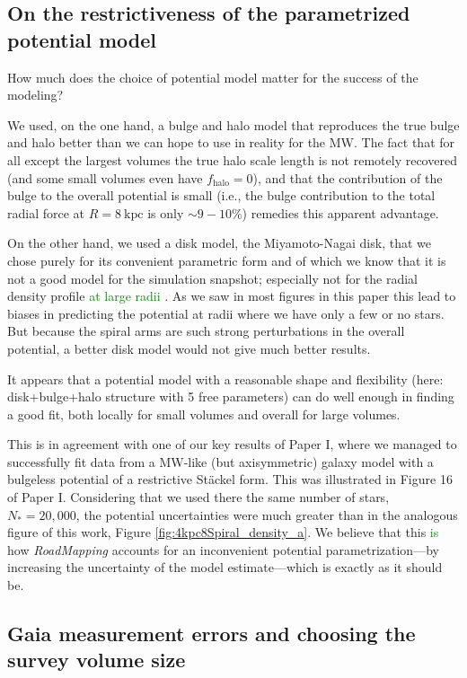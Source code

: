 \documentclass[iop,revtex4,numberedappendix,appendixfloats]{emulateapj}
\newcommand{\RM}{{\sl RoadMapping}}
\newcommand{\NEW}[1]{\textcolor{Green}{#1}}
\newcommand{\OLD}[1]{}
\begin{document}
\subsection{On the restrictiveness of the parametrized potential model}

How much does the choice of potential model matter for the success of the modeling?

We used, on the one hand, a bulge and halo model that reproduces the true bulge and halo better than we can hope to use in reality for the MW. The fact that for all except the largest volumes the true halo scale length is not remotely recovered (and some small volumes even have $f_\text{halo}=0$), and that the contribution of the bulge to the overall potential is small (i.e., the bulge contribution to the total radial force at $R=8~\text{kpc}$ is only $\sim 9-10\%$) remedies this apparent advantage. 

On the other hand, we used a disk model, the Miyamoto-Nagai disk, that we chose purely for its convenient parametric form and of which we know that it is not a good model for the simulation snapshot; especially not for the radial density profile \NEW{at large radii \citep{2015MNRAS.448.2934S}}. As we saw in most figures in this paper this \OLD{might} lead to biases in predicting the potential at radii where we have only a few or no stars. But because the spiral arms are such strong perturbations in the overall potential, a better disk model would \OLD{probably} not give much better results.

It appears that a potential model with a reasonable shape and flexibility (here: disk+bulge+halo structure with 5 free parameters) can do well enough in finding a good fit, both locally for small volumes and overall for large volumes.

This is in agreement with one of our key results of Paper I, where we managed to successfully fit data from a MW-like (but axisymmetric) galaxy model with a bulgeless potential of a restrictive St\"ackel form. This was illustrated in Figure 16 of Paper I. Considering that we used there the same number of stars, $N_*=20,000$, the potential uncertainties were much greater than in the analogous figure of this work, Figure \ref{fig:4kpc8Spiral_density_a}. We believe that this \NEW{is} how \RM{} accounts for an inconvenient potential parametrization---by increasing the uncertainty of the model estimate---which is exactly as it should be.

\subsection{Gaia measurement errors and choosing the survey volume size} \label{sec:discussion_choosing_SV}
\end{document}

